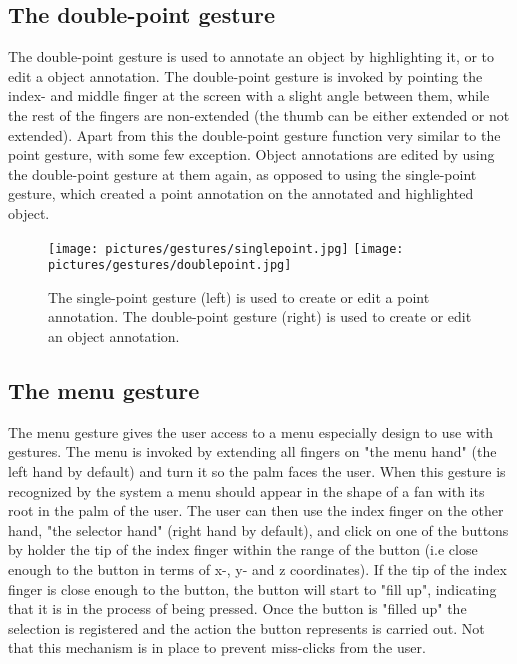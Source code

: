 \subsection{The double-point gesture}
The double-point gesture is used to annotate an object by highlighting it, or to edit a object annotation. The double-point gesture is invoked by pointing the index- and
middle finger at the screen with a slight angle between them, while the rest of the fingers are non-extended (the thumb can be either extended or not extended).
Apart from this the double-point gesture function very similar to the point gesture, with some few exception. Object annotations are edited by using the 
double-point gesture at them again, as opposed to using the single-point gesture, which created a point annotation on the annotated and highlighted object.

\begin{figure}%
	\texttt{[image: pictures/gestures/singlepoint.jpg]}
    \texttt{[image: pictures/gestures/doublepoint.jpg]}
	\caption[The single-point and double-point gestures]{The single-point gesture (left) is used to create or edit a point annotation. 
             The double-point gesture (right) is used to create or edit an object annotation.}
	\label{fig:gestures3}
\end{figure} 

\subsection{The menu gesture}
The menu gesture gives the user access to a menu especially design to use with gestures. The menu is invoked by extending all fingers on 
"the menu hand" (the left hand by default) and turn it so the palm faces the user. When this gesture is recognized by the system a menu should 
appear in the shape of a fan with its root in the palm of the user. The user can then use the index finger on the other hand, "the selector hand" (right hand by default),
and click on one of the buttons by holder the tip of the index finger within the range of the button (i.e close enough to the button in terms of x-, y- and z coordinates).
If the tip of the index finger is close enough to the button, the button will start to "fill up", indicating that it is in the process of being pressed.
Once the button is "filled up" the selection is registered and the action the button represents is carried out. Not that this mechanism is in place
to prevent miss-clicks from the user.

